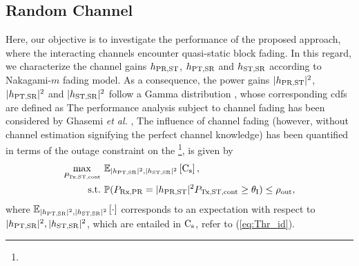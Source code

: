\subsection{Random Channel}\label{ssec:ltpa}
Here, our objective is to investigate the performance of the proposed approach, where the interacting channels encounter quasi-static block fading.  In this regard, we characterize the channel gains $h_{\text{PR,ST}}$, $h_{\text{PT,SR}}$ and $h_{\text{ST,SR}}$ according to Nakagami-$m$ fading model. As a consequence, the power gains $|h_{\text{PR,ST}}|^2$, $|h_{\text{PT,SR}}|^2$ and $|h_{\text{ST,SR}}|^2$ follow a Gamma distribution \cite{Goldsmith05}, whose corresponding cdfs are defined as  The performance analysis subject to channel fading has been considered by Ghasemi \textit{et al.} \cite{Ghasemi06, Ghasemi07},  The influence of channel fading (however, without channel estimation signifying the perfect channel knowledge) has been quantified in terms of the outage constraint on the \footnote{}, is given by %
\begin{align}
	\tc{\maxi_{\preg}} & \text{ } \e{\pgpt, \pgs }{\ca} \label{eq:sys_id_fad}, \\
	\text{s.t.} & \text{ } \tc{\p(\pp = \pgpo \preg \ge \ite)} \le \opc, \label{eq:opc_id_fad} 
\end{align}
where ${\mathbb E}_{|h_{\text{PT,SR}}|^2, |h_{\text{ST,SR}}|^2}\left[ \cdot \right]$ corresponds to an expectation with respect to $|h_{\text{PT,SR}}|^2, |h_{\text{ST,SR}}|^2$, which are entailed in $\text{C}_{\text{s}}$, refer to (\ref{eq:Thr_id}).


